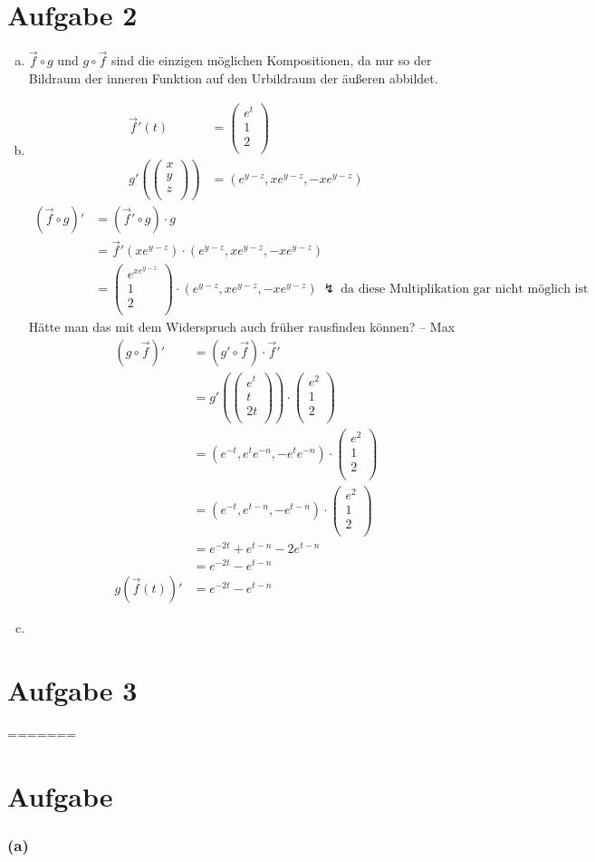 \documentclass[10pt,a4paper,parskip=half]{scrartcl}
\newcommand{\vecthree}[3]{\left(\begin {array} {c}#1\\#2\\#3\\\end {array} \right) }
\begin{document}
\section*{Aufgabe 2}
\begin{enumerate}[(a)]
\item
$\vec f \circ g$ und $ g \circ \vec f$ sind die einzigen möglichen Kompositionen, da nur so der Bildraum der inneren Funktion auf den Urbildraum der äußeren abbildet.
\item
\begin{align*}
\vec f'(t) &= \vecthree{e^t}{1}{2} \\
g'(\vecthree{x}{y}{z}) &= \left(e^{y-z}, xe^{y-z}, -xe^{y-z}\right)
\end{align*}
\begin{align*} 
(\vec f \circ g)' &= (\vec f' \circ g) \cdot g \\
&= \vec f'(xe^{y-z}) \cdot \left(e^{y-z}, xe^{y-z}, -xe^{y-z}\right) \\
&= \vecthree{e^{xe^{y-z}}}{1}{2} \cdot \left(e^{y-z}, xe^{y-z}, -xe^{y-z}\right) \ \lightning\ \text{da diese Multiplikation gar nicht möglich ist}
\end{align*}
Hätte man das mit dem Widerspruch auch früher rausfinden können? -- Max
\begin{align*} 
(g \circ \vec f)' &= (g' \circ \vec f) \cdot \vec f' \\
&= g'(\vecthree{e^t}{t}{2t}) \cdot \vecthree{e^2}{1}{2} \\
&= \left(e^{-t}, e^te^{-n}, -e^te^{-n}\right) \cdot \vecthree{e^2}{1}{2} \\
&= \left(e^{-t}, e^{t-n}, -e^{t-n}\right) \cdot \vecthree{e^2}{1}{2} \\
&= e^{-2t} + e^{t-n} - 2e^{t-n}\\
&= e^{-2t} - e^{t-n}\\
g(\vec f(t))' &= e^{-2t} - e^{t-n}
\end{align*}

\item
\end{enumerate}
\section*{Aufgabe 3}
=======
\section{Aufgabe}
\subsubsection*{\textbf{(a)}}
\end{document}
